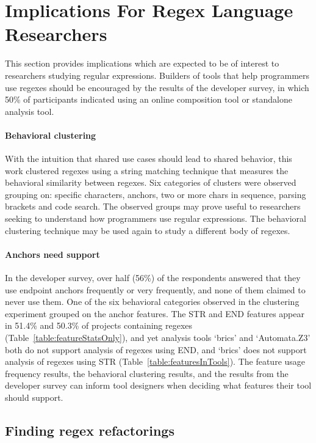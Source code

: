 \section{Implications For Regex Language Researchers}
This section provides implications which are expected to be of interest to researchers studying regular expressions.  Builders of tools that help programmers use regexes should be encouraged by the results of the developer survey, in which 50\% of participants indicated using an online composition tool or standalone analysis tool.

\paragraph{Behavioral clustering}  With the intuition that shared use cases should lead to shared behavior, this work clustered regexes using a string matching technique that measures the behavioral similarity between regexes.  Six categories of clusters were observed grouping on: specific characters, anchors, two or more chars in sequence, parsing brackets and code search.  The observed groups may prove useful to researchers seeking to understand how programmers use regular expressions.  The behavioral clustering technique may be used again to study a different body of regexes.

\paragraph{Anchors need support}  In the developer survey, over half (56\%) of the respondents answered that they use endpoint anchors frequently or very frequently, and none of them claimed to never use them.  One of the six behavioral categories observed in the clustering experiment grouped on the anchor features.  The STR and END features appear in 51.4\% and 50.3\% of projects containing regexes (Table~\ref{table:featureStatsOnly}), and yet analysis tools `brics' and `Automata.Z3' both do not support analysis of regexes using END, and `brics' does not support analysis of regexes using STR (Table~\ref{table:featuresInTools}).  The feature usage frequency results, the behavioral clustering results, and the results from the developer survey can inform tool designers when deciding what features their tool should support.

\subsection{Finding regex refactorings}

